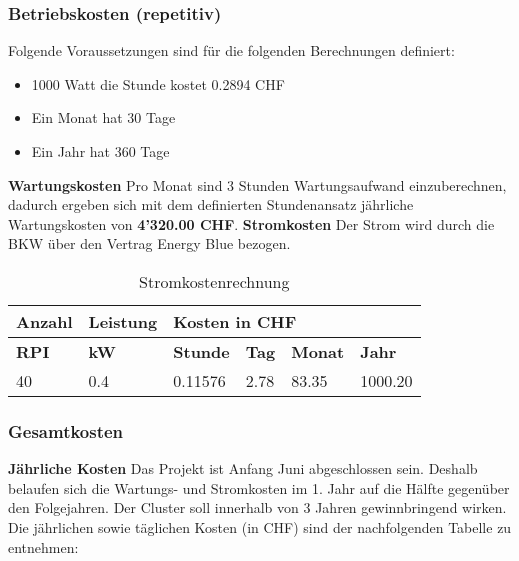\subsubsection{Betriebskosten (repetitiv)}

Folgende Voraussetzungen sind für die folgenden Berechnungen definiert:
\begin{itemize}
	\item 1000 Watt die Stunde kostet 0.2894 CHF
	\item Ein Monat hat 30 Tage
	\item Ein Jahr hat 360 Tage
\end{itemize}

\textbf{Wartungskosten}
\newline
Pro Monat sind 3 Stunden Wartungsaufwand einzuberechnen, dadurch ergeben sich mit dem definierten Stundenansatz jährliche Wartungskosten von \textbf{4'320.00 CHF}. \newline
\newline
\textbf{Stromkosten}
Der Strom wird durch die BKW über den Vertrag Energy Blue bezogen.

\begin{table}[H]
\centering
\begin{tabular}{p{1.5cm}p{2cm}|p{2.75cm}p{2.75cm}p{2.75cm}p{2.75cm}}
\hline
\rowcolor{heading} \textbf{Anzahl} & \textbf{Leistung} & \multicolumn{4}{l}{\textbf{Kosten in CHF}} \\\hline
\rowcolor{subheading} \textbf{RPI} & \textbf{kW} & \textbf{Stunde} &\textbf{Tag} & \textbf{Monat} &\textbf{Jahr} \\\hline
40 & 0.4 & 0.11576 & 2.78 & 83.35 & 1000.20 \\\hline
\end{tabular}
\caption{Stromkostenrechnung}
\end{table}

\subsubsection{Gesamtkosten}

\textbf{Jährliche Kosten} \newline
Das Projekt ist Anfang Juni abgeschlossen sein. Deshalb belaufen sich die Wartungs- und Stromkosten im 1. Jahr auf die Hälfte gegenüber den Folgejahren.
Der Cluster soll innerhalb von 3 Jahren gewinnbringend wirken. Die jährlichen sowie täglichen Kosten (in CHF) sind der nachfolgenden Tabelle zu entnehmen: 

